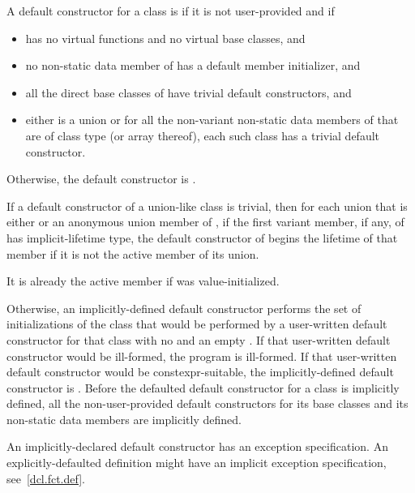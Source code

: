 \pnum
A default constructor for a class  is
if it is not user-provided and if
\begin{itemize}
\item
{} has no virtual functions and no virtual base
classes, and

\item no non-static data member of  has
a default member initializer, and

\item
all the direct base classes of  have trivial default constructors, and

\item
either  is a union or
for all the non-variant non-static data members of  that are of class
type (or array thereof), each such class has a trivial default constructor.
\end{itemize}

Otherwise, the default constructor is
.

\pnum
If a default constructor of a union-like class  is trivial,
then for each union 
that is either  or an anonymous union member of ,
if the first variant member, if any, of 
has implicit-lifetime type,
the default constructor of  begins the lifetime of that member
if it is not the active member of its union.
\begin{note}
It is already the active member if  was value-initialized.
\end{note}
Otherwise,
an implicitly-defined default constructor performs the set of
initializations of the class that would be performed by a user-written default
constructor for that class with no
 and an empty
.
If that user-written default constructor would be ill-formed,
the program is ill-formed.
If that user-written default constructor would be constexpr-suitable,
the implicitly-defined
default constructor is .
Before the defaulted default constructor for a class is
implicitly defined,
all the non-user-provided default constructors for its base classes and
its non-static data members are implicitly defined.
\begin{note}
An implicitly-declared default constructor has an
exception specification.
An explicitly-defaulted definition might have an
implicit exception specification, see~\ref{dcl.fct.def}.
\end{note}

